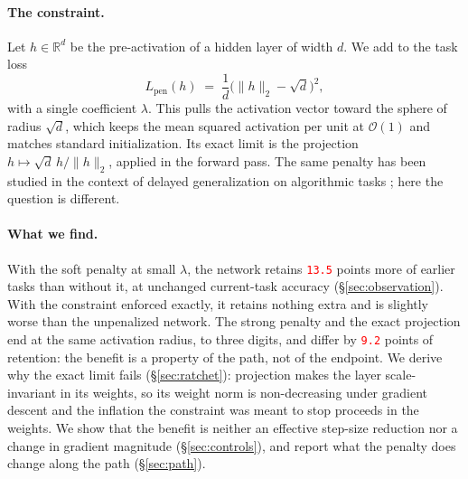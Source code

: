 \documentclass[anon]{opt2026}     %
\newcommand{\PH}[1]{\textcolor{red}{\texttt{#1}}}   %
\newcommand{\R}{\mathbb{R}}
\begin{document}
\paragraph{The constraint.} Let $h \in \R^{d}$ be the pre-activation of a hidden
layer of width $d$. We add to the task loss
\begin{equation}
\label{eq:penalty}
L_{\mathrm{pen}}(h) \;=\; \frac{1}{d}\bigl(\|h\|_2 - \sqrt{d}\bigr)^{2},
\end{equation}
with a single coefficient $\lambda$. This pulls the activation vector toward the
sphere of radius $\sqrt{d}$, which keeps the mean squared activation per unit at
$\mathcal{O}(1)$ and matches standard initialization. Its exact limit is the
projection $h \mapsto \sqrt d\, h / \|h\|_2$, applied in the forward pass. The
same penalty has been studied in the context of delayed generalization on
algorithmic tasks \citep{anon2026radial}; here the question is different.

\paragraph{What we find.} With the soft penalty at small $\lambda$, the network
retains \PH{13.5} points more of earlier tasks than without it, at unchanged
current-task accuracy (\S\ref{sec:observation}). With the constraint enforced
exactly, it retains nothing extra and is slightly worse than the unpenalized
network. The strong penalty and the exact projection end at the same activation
radius, to three digits, and differ by \PH{9.2} points of retention: the
benefit is a property of the path, not of the endpoint. We derive why the exact
limit fails (\S\ref{sec:ratchet}): projection makes the layer scale-invariant in
its weights, so its weight norm is non-decreasing under gradient descent and the
inflation the constraint was meant to stop proceeds in the weights. We show that
the benefit is neither an effective step-size reduction nor a change in gradient
magnitude (\S\ref{sec:controls}), and report what the penalty does change along
the path (\S\ref{sec:path}).
\end{document}
